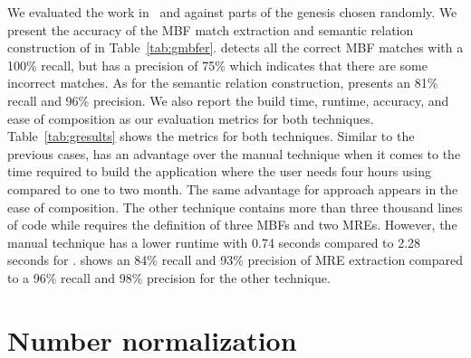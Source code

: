 \begin{appendices}
\begin{table}[tb!]
  \centering
  \caption{\framework~against manual coding of genealogy extraction: Time, accuracy, and ease of composition}
  \label{tab:gresults}%
\end{table}%

We evaluated the work in~\cite{ZaMaHaCicling2012Entity} and \framework against parts of the genesis chosen randomly. 
We present the accuracy of the MBF match extraction and semantic relation construction of \framework in Table~\ref{tab:gmbfer}. 
\framework detects all the correct MBF matches with a 100\% recall, but has a precision of 75\% which indicates that there are some incorrect matches. 
As for the semantic relation construction, \framework presents an 81\% recall and 96\% precision. 
We also report the build time, runtime, accuracy, and ease of composition as our evaluation metrics for both techniques. 
Table~\ref{tab:gresults} shows the metrics for both techniques. 
Similar to the previous cases, \framework has an advantage over the manual technique when it comes to the time required to build the application where the user needs four hours using \framework compared to one to two month. 
The same advantage for \framework approach appears in the ease of composition. 
The other technique contains more than three thousand lines of code while \framework requires the definition of three MBFs and two MREs. 
However, the manual technique has a lower runtime with 0.74 seconds compared to 2.28 seconds for \framework. 
\framework shows an 84\% recall and 93\% precision of MRE extraction compared to a 96\% recall and 98\% precision for the other technique.

\newpage

\section{Number normalization}
\label{a:numnorm}


\end{appendices}

